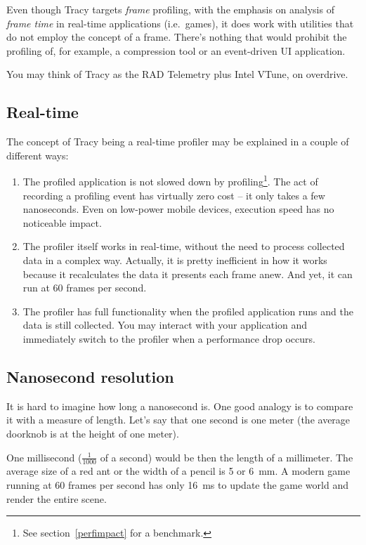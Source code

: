 \documentclass[hidelinks,titlepage,a4paper]{article}
\begin{document}
Even though Tracy targets \emph{frame} profiling, with the emphasis on analysis of \emph{frame time} in real-time applications (i.e.~games), it does work with utilities that do not employ the concept of a frame. There's nothing that would prohibit the profiling of, for example, a compression tool or an event-driven UI application.

You may think of Tracy as the RAD Telemetry plus Intel VTune, on overdrive.

\subsection{Real-time}

The concept of Tracy being a real-time profiler may be explained in a couple of different ways:

\begin{enumerate}
\item The profiled application is not slowed down by profiling\footnote{See section~\ref{perfimpact} for a benchmark.}. The act of recording a profiling event has virtually zero cost -- it only takes a few nanoseconds. Even on low-power mobile devices, execution speed has no noticeable impact.
\item The profiler itself works in real-time, without the need to process collected data in a complex way. Actually, it is pretty inefficient in how it works because it recalculates the data it presents each frame anew. And yet, it can run at 60 frames per second.
\item The profiler has full functionality when the profiled application runs and the data is still collected. You may interact with your application and immediately switch to the profiler when a performance drop occurs.
\end{enumerate}

\subsection{Nanosecond resolution}

It is hard to imagine how long a nanosecond is. One good analogy is to compare it with a measure of length. Let's say that one second is one meter (the average doorknob is at the height of one meter).

One millisecond ($\frac{1}{1000}$ of a second) would be then the length of a millimeter. The average size of a red ant or the width of a pencil is 5 or 6~\si{\milli\metre}. A modern game running at 60 frames per second has only 16~\si{\milli\second} to update the game world and render the entire scene.
\end{document}
